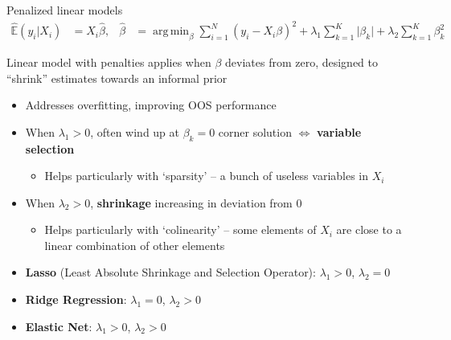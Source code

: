 \documentclass[xcolor=table, aspectratio=169]{beamer}
\newcommand{\alertbf}[1]{\alert{\textbf{#1}}}
\newcommand{\E}{\mathbb{E}}
\DeclareMathOperator*{\argmin}{arg\,min}
\begin{document}
\begin{frame}[t]{Penalized linear models}
\vspace{-12pt}
\begin{align*}
    \hat{\E}( y_i | X_i) &= X_i \hat{\beta}, &
\hat{\beta} &= \argmin_\beta \sum_{i=1}^N \left( y_i - X_i \beta \right)^2 + \lambda_1 \sum_{k=1}^K \vert \beta_k \vert + \lambda_2 \sum_{k=1}^K \beta_k^2
\end{align*}

Linear model with penalties applies when $\beta$ deviates from zero, designed to ``shrink'' estimates towards an informal prior
    \begin{itemize}
        \item Addresses overfitting, improving OOS performance
        \item When $\lambda_1 > 0$, often wind up at $\beta_k = 0$ corner solution $\Leftrightarrow$ \alertbf{variable selection}
        \begin{itemize}
            \item Helps particularly with `sparsity' -- a bunch of useless variables in $X_i$
        \end{itemize}
        \item When $\lambda_2 > 0$, \alertbf{shrinkage} increasing in deviation from 0
        \begin{itemize}
            \item Helps particularly with `colinearity' -- some elements of $X_i$ are close to a linear combination of other elements
        \end{itemize}
        \item \alertbf{Lasso} (Least Absolute Shrinkage and Selection Operator): $\lambda_1 > 0$, $\lambda_2=0$
        \item \alertbf{Ridge Regression}: $\lambda_1 = 0$, $\lambda_2>0$
        \item \alertbf{Elastic Net}: $\lambda_1 > 0$, $\lambda_2 > 0$
    \end{itemize}
\end{frame}
\end{document}
